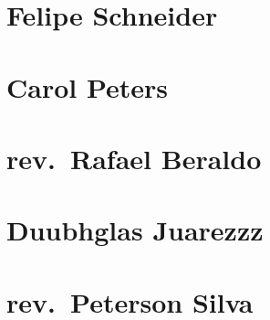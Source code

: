 \documentclass[10pt,openright,final,twoside,a5paper]{memoir}
\begin{document}
\pagestyle{empty}
\setlength{\parskip}{1pt plus1pt minus1pt}
\frenchspacing






\tableofcontents*

\mainmatter
\clearpage\pagestyle{bringhurst}
\newpage
	

\pagestyle{bringhurst}

	\part{Felipe Schneider}
		
		

	\part{Carol Peters}
		

	\part{rev.~Rafael Beraldo}
		
		
		
		
		

	\part{Duubhglas Juarezzz}
		
		
		
		
		

	\part{rev.~Peterson Silva}
		
		
		
		
		
		

\backmatter
\pagestyle{empty}
	
	
\end{document}
